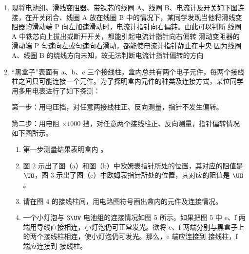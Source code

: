 \documentclass[\gkver]{gaokaozhenti}
\begin{document}
\begin{enumerate}
\item
现将电池组、滑线变阻器、带铁芯的线圈 A、线圈 B、电流计及开关如下图连接，在开关闭合、线圈 A 放在线圈 B 中的情况下，某同学发现当他将滑线变阻器的滑动端 P 向左加速滑动时，电流计指针向右偏转。由此可以判断
{线圈 A 中铁芯向上拔出或断开开关，都能引起电流计指针向右偏转}
{滑动变阻器的滑动端 P 匀速向左或匀速向右滑动，都能使电流计指针静止在中央}
{因为线圈 A、线圈 B 的绕线方向未知，故无法判断电流计指针偏转的方向}

\item
“黑盒子”表面有 a、b、c 三个接线柱，盒内总共有两个电子元件，每两个接线柱之间只可能连接一个元件。为了探明盒内元件的种类及连接方式，某位同学用多用电表进行了如下探测：

第一步：用电压挡，对任意两接线柱正、反向测量，指针不发生偏转。

第二步：用电阻 $\times1000$ 挡，对任意两个接线柱正、反向测量，指针偏转情况如下图所示。


\begin{enumerate}
	\item
	第一步测量结果表明盒内 。
	\item
	图 2 示出了图（a）和图（b）中欧姆表指针所处的位置，其对应的阻值是  $\UO$，图 3 示出了图（c）中欧姆表指针所处的位置，其对应的阻值是  $\UO$。

	\item
	请在图 4 的接线柱间，用电路图符号画出盒内的元件及连接情况。

	\item
	一个小灯泡与 $3\UV$ 电池组的连接情况如图 5 所示。如果把图 5 中 e、f 两端用导线直接相连，小灯泡仍可正常发光。欲将 e、f 两端分别与黑盒子上的两个接线柱相连，使小灯泡仍可发光。那么，e 端应连接到  接线柱，f 端应连接到  接线柱。


\end{enumerate}
\end{enumerate}
\end{document}
